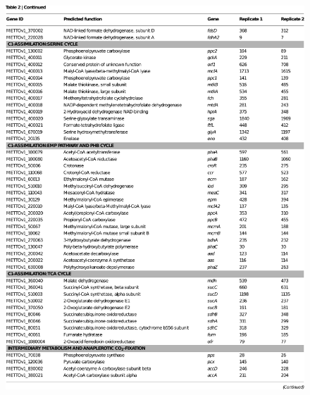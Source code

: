 \begin{figure}[H]
\centering
     \includegraphics[width=1.0\textwidth]{./tex/chapter1/figures/matsen_OB3b_table2_piece2--cropped.pdf}
\end{figure}

